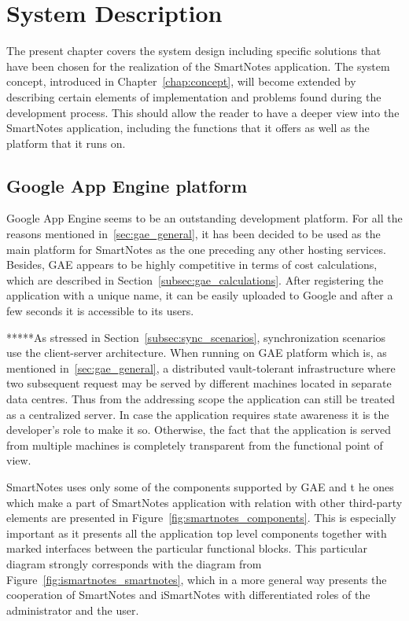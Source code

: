 \chapter{System Description}\label{chap:sys_description}
The present chapter covers the system design including specific solutions that have been chosen for the realization of the SmartNotes application. The system concept, introduced in Chapter~\ref{chap:concept}, will become extended by describing certain elements of implementation and problems found during the development process. This should allow the reader to have a deeper view into the SmartNotes application, including the functions that it offers as well as the platform that it runs on.
\section{Google App Engine platform}\label{sec:gae}
Google App Engine seems to be an outstanding development platform. For all the reasons mentioned in~\ref{sec:gae_general}, it has been decided to be used as the main platform for SmartNotes as the one preceding any other hosting services. Besides, GAE appears to be highly competitive in terms of cost calculations, which are described in Section~\ref{subsec:gae_calculations}. After registering the application with a unique name, it can be easily uploaded to Google and after a few seconds it is accessible to its users.

*****As stressed in Section~\ref{subsec:sync_scenarios}, synchronization scenarios use the client-server architecture. When running on GAE platform which is, as mentioned in~\ref{sec:gae_general}, a distributed vault-tolerant infrastructure where two subsequent request may be served by different machines located in separate data centres. Thus from the addressing scope the application can still be treated as a centralized server. In case the application requires state awareness it is the developer's role to make it so. Otherwise, the fact that the application is served from multiple machines is completely transparent from the functional point of view.

SmartNotes uses only some of the components supported by GAE and t he ones which make a part of SmartNotes application with relation with other third-party elements are presented in Figure~\ref{fig:smartnotes_components}. This is especially important as it presents all the application top level components together with marked interfaces between the particular functional blocks. This particular diagram strongly corresponds with the diagram from Figure~\ref{fig:ismartnotes_smartnotes}, which in a more general way presents the cooperation of SmartNotes and iSmartNotes with differentiated roles of the administrator and the user. 


